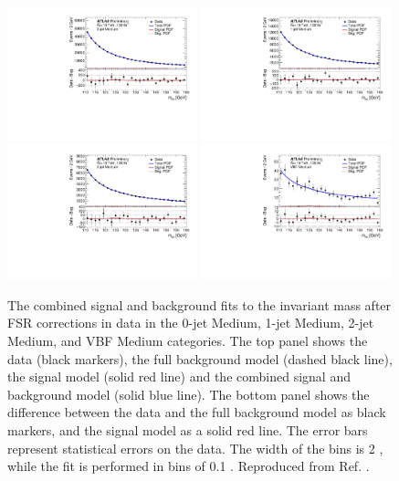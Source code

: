 \begin{figure}[h!]
  \centering
  \includegraphics[width=0.49\textwidth]{figures/hmumu/fits/BDT11}
  \includegraphics[width=0.49\textwidth]{figures/hmumu/fits/BDT8}
  \includegraphics[width=0.49\textwidth]{figures/hmumu/fits/BDT5}
  \includegraphics[width=0.49\textwidth]{figures/hmumu/fits/BDT2}
  \caption[Combined signal and background fit to data for Medium categories]{
  The combined signal and background fits to the invariant mass after FSR
  corrections in data in the 0-jet Medium, 1-jet Medium, 2-jet Medium,
  and VBF Medium categories. The top panel shows the data (black
  markers), the full background model (dashed black line), the signal
  model (solid red line) and the combined signal and background model
  (solid blue line). The bottom panel shows the difference between the data
  and the full background model as black markers, and the signal model
  as a solid red line. The error bars represent statistical errors on
  the data. The width of the bins is 2 \GeV, while the fit is
  performed in bins of 0.1 \GeV.
  Reproduced from Ref. \cite{ATLAS-CONF-2019-028}.
  }
  \label{fig:hmumu:fit-medium}
\end{figure}



